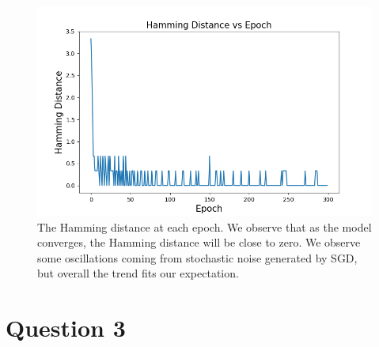 \documentclass[
	12pt, %
]{../Template/fphw}
\begin{document}
\begin{figure}[!htbp]
    \centering
    \includegraphics[width=0.9\linewidth]{HW1/q3.png}
    \caption{The Hamming distance at each epoch. We observe that as the model converges, the Hamming distance will be close to zero. We observe some oscillations coming from stochastic noise generated by SGD, but overall the trend fits our expectation.}
    \label{fig: q3}
\end{figure}

\section*{Question 3}
\end{document}
